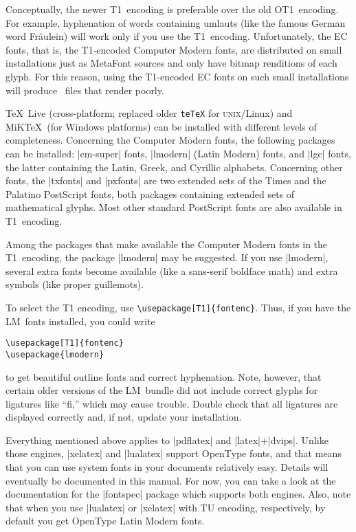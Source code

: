 Conceptually, the newer T1~encoding is preferable over the old OT1~encoding. For example, hyphenation of words containing umlauts (like the famous German word Fr\"aulein) will work only if you use the T1~encoding. Unfortunately, the EC fonts, that is, the T1-encoded Computer Modern fonts, are distributed on small installations just as MetaFont sources and only have bitmap renditions of each glyph. For this reason, using the T1-encoded EC fonts on such small installations will produce \pdf\ files that render poorly.

\TeX\ Live (cross-platform; replaced older \texttt{teTeX} for \textsc{unix}\slash Linux) and MiK\TeX\ (for Windows platforms) can be installed with different levels of completeness. Concerning the Computer Modern fonts, the following packages can be installed: |cm-super| fonts, |lmodern| (Latin Modern) fonts, and |lgc| fonts, the latter containing the Latin, Greek, and Cyrillic alphabets. Concerning other fonts, the |txfonts| and |pxfonts| are two extended sets of the Times and the Palatino PostScript fonts, both packages containing extended sets of mathematical glyphs. Most other standard PostScript fonts are also available in T1~encoding.

Among the packages that make available the Computer Modern fonts in the T1~encoding, the package |lmodern| may be suggested. If you use |lmodern|, several extra fonts become available (like a sans-serif boldface math) and extra symbols (like proper guillemots).

To select the T1 encoding, use \verb|\usepackage[T1]{fontenc}|. Thus, if you have the LM~fonts installed, you could write
\begin{verbatim}
\usepackage[T1]{fontenc}
\usepackage{lmodern}
\end{verbatim}
to get beautiful outline fonts and correct hyphenation. Note, however, that certain older versions of the LM~bundle did not include correct glyphs for ligatures like ``fi,'' which may cause trouble. Double check that all ligatures are displayed correctly and, if not, update your installation.

Everything mentioned above applies to |pdflatex| and |latex|+|dvips|. Unlike those engines, |xelatex| and |lualatex| support OpenType fonts, and that means that you can use system fonts in your documents relatively easy. Details will eventually be documented in this manual. For now, you can take a look at the documentation for the |fontspec| package which supports both engines. Also, note that when you use |lualatex| or |xelatex| with TU encoding, respectively, by default you get OpenType Latin Modern fonts.


